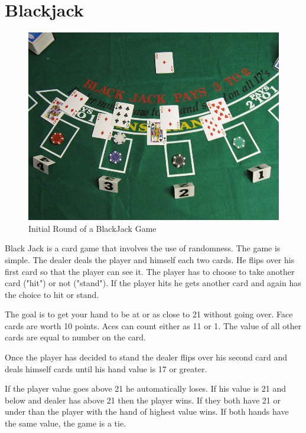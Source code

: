 \label{Ch:BJ}


\section*{Blackjack}

\begin{figure}[H]
\includegraphics[scale = .9]{Blackjack_game_1.jpg}
\caption{Initial Round of a BlackJack Game}
\end{figure}

Black Jack is a card game that involves the use of randomness.
The game is simple.
The dealer deals the player and himself each two cards.
He flips over his first card so that the player can see it.
The player has to choose to take another card ("hit") or not ("stand").
If the player hits he gets another card and again has the choice to hit or stand.

The goal is to get your hand to be at or as close to 21 without going over.
Face cards are worth 10 points.
Aces can count either as 11 or 1.
The value of all other cards are equal to number on the card.

Once the player has decided to stand the dealer flips over his second card and deals himself cards until his hand value is 17 or greater. 

If the player value goes above 21 he automatically loses.
If his value is 21 and below and dealer has above 21 then the player wins.
If they both have 21 or under than the player with the hand of highest value wins.
If both hands have the same value, the game is a tie.

